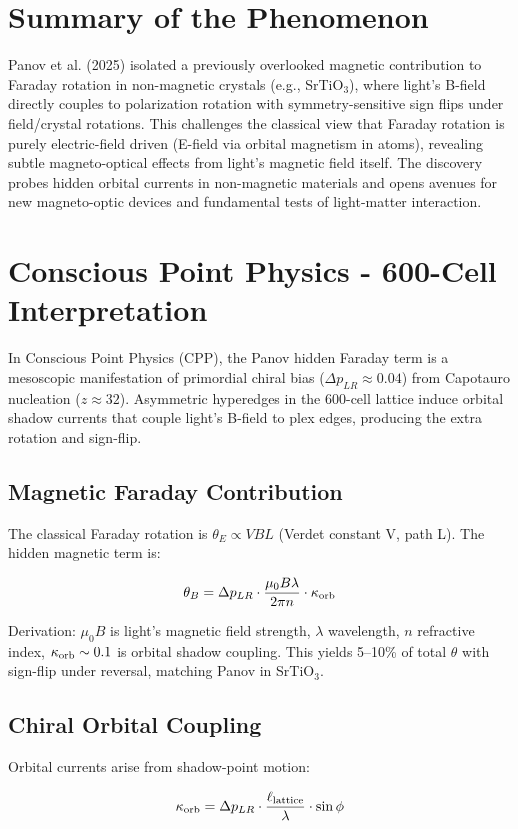 \documentclass[11pt]{article}
\begin{document}
\section{Summary of the Phenomenon}
Panov et al. (2025) isolated a previously overlooked magnetic contribution to Faraday rotation in non-magnetic crystals (e.g., SrTiO$_3$), where light's B-field directly couples to polarization rotation with symmetry-sensitive sign flips under field/crystal rotations. This challenges the classical view that Faraday rotation is purely electric-field driven (E-field via orbital magnetism in atoms), revealing subtle magneto-optical effects from light's magnetic field itself. The discovery probes hidden orbital currents in non-magnetic materials and opens avenues for new magneto-optic devices and fundamental tests of light-matter interaction.

\section{Conscious Point Physics - 600-Cell Interpretation}
In Conscious Point Physics (CPP), the Panov hidden Faraday term is a mesoscopic manifestation of primordial chiral bias ($\Delta p_{LR} \approx 0.04$) from Capotauro nucleation ($z \approx 32$). Asymmetric hyperedges in the 600-cell lattice induce orbital shadow currents that couple light's B-field to plex edges, producing the extra rotation and sign-flip.

\subsection{Magnetic Faraday Contribution}
The classical Faraday rotation is $\theta_E \propto V B L$ (Verdet constant V, path L). The hidden magnetic term is:

\[
\theta_B = \Delta p_{LR} \cdot \frac{\mu_0 B \lambda}{2\pi n} \cdot \kappa_{\rm orb}
\]

Derivation: $\mu_0 B$ is light's magnetic field strength, $\lambda$ wavelength, $n$ refractive index, $\kappa_{\rm orb} \sim 0.1$ is orbital shadow coupling. This yields 5–10\% of total $\theta$ with sign-flip under reversal, matching Panov in SrTiO$_3$.

\subsection{Chiral Orbital Coupling}
Orbital currents arise from shadow-point motion:

\[
\kappa_{\rm orb} = \Delta p_{LR} \cdot \frac{\ell_{\text{lattice}}}{\lambda} \cdot \sin\phi
\]
\end{document}
